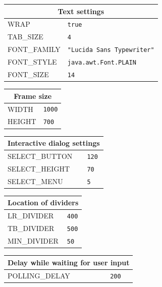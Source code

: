 \documentclass[11pt]{article}
\begin{document}
\begin{center}
\bigskip

\begin{tabular}{|p{}|p{}|}
\hline
\multicolumn{2}{|c|}{Text settings}\\ \hline
\textsc{\ttfamily WRAP} &\verb+true+\\
\textsc{\ttfamily TAB\_SIZE} &\verb+4+\\
\textsc{\ttfamily FONT\_FAMILY} & \verb+"Lucida Sans Typewriter"+\\ 
\textsc{\ttfamily FONT\_STYLE} & \verb+java.awt.Font.PLAIN+\\
\textsc{\ttfamily FONT\_SIZE} & \verb+14+\\\hline
\end{tabular}

\bigskip

\begin{tabular}{|p{}|p{}|}
\hline
\multicolumn{2}{|c|}{Frame size}\\ \hline
\textsc{\ttfamily WIDTH} &\verb+1000+\\
\textsc{\ttfamily HEIGHT} &\verb+700+\\\hline
\end{tabular}

\bigskip

\begin{tabular}{|p{}|p{}|}
\hline
\multicolumn{2}{|c|}{Interactive dialog settings}\\ \hline
\textsc{\ttfamily SELECT\_BUTTON} &\verb+120+\\
\textsc{\ttfamily SELECT\_HEIGHT} &\verb+70+\\
\textsc{\ttfamily SELECT\_MENU} &\verb+5+\\\hline
\end{tabular}

\bigskip

\begin{tabular}{|p{}|p{}|}
\hline
\multicolumn{2}{|c|}{Location of dividers}\\ \hline
\textsc{\ttfamily LR\_DIVIDER} &\verb+400+\\
\textsc{\ttfamily TB\_DIVIDER} &\verb+500+\\
\textsc{\ttfamily MIN\_DIVIDER} &\verb+50+\\\hline
\end{tabular}

\bigskip

\begin{tabular}{|p{}|p{}|}
\hline
\multicolumn{2}{|c|}{Delay while waiting for user input}\\ \hline
\textsc{\ttfamily POLLING\_DELAY} &\verb+200+\\\hline
\end{tabular}

\end{center}
\end{document}
